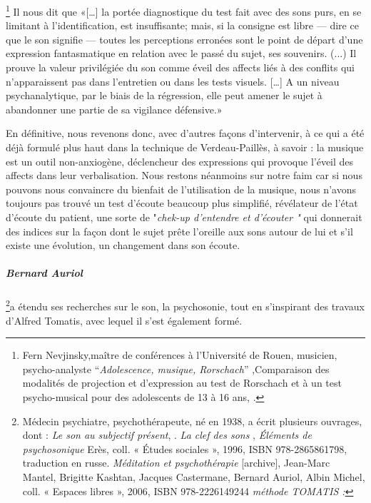 \footnote{Fern Nevjinsky,maître de conférences à l'Université de Rouen, musicien, psycho-analyste ``\emph{Adolescence, musique, Rorschach}'' ,Comparaison des modalités de projection et d'expression au test de Rorschach et à un test psycho-musical pour des adolescents de 13 à 16 ans,
  \cite{Nevjinsky1996}.} Il nous dit  que  «[\ldots] la
portée diagnostique du test fait avec des sons purs, en se limitant à
l'identification, est insuffisante; mais, si la consigne est libre ---
dire ce que le son signifie --- toutes les perceptions erronées sont
le point de départ d'une expression fantasmatique en relation avec le
passé du sujet, ses souvenirs. (...) Il prouve  la valeur privilégiée du son comme éveil
des affects liés à des conflits qui n'apparaissent pas dans
l'entretien ou dans les tests visuels.  [\ldots] A un niveau
psychanalytique, par le biais de la régression, elle peut amener le sujet à abandonner une partie de sa vigilance défensive.»

En définitive, nous revenons donc, avec d'autres façons d'intervenir,
à ce qui a été déjà formulé plus haut dans la technique de Verdeau-Paillès,
à savoir : la musique est un outil non-anxiogène, déclencheur des expressions qui provoque
l'éveil des affects dans  leur verbalisation. Nous restons néanmoins sur notre faim car si nous pouvons nous convaincre du bienfait de l'utilisation de la musique, nous n'avons toujours pas trouvé un test d'écoute beaucoup plus simplifié, révélateur de l'état d'écoute du patient, une sorte de "\textit{chek-up d'entendre et d'écouter "} qui donnerait des indices sur la façon dont le sujet prête l'oreille aux sons autour de lui et s'il existe une évolution, un changement dans son écoute.


\subparagraph{Bernard Auriol}\footnote{Médecin psychiatre, psychothérapeute, né en
  1938, a écrit plusieurs ouvrages, dont : \emph{Le son au subjectif
    présent}, \cite{auriol96sonausubjectifpresent}.
\emph{ La clef des sons} \cite{Auri96:clesons}, \emph{Éléments de
  psychosonique} Erès, coll. « Études sociales », 1996, ISBN
978-2865861798, traduction en russe. \emph{Méditation et
  psychothérapie} {[}archive{]}, Jean-Marc Mantel, Brigitte Kashtan,
Jacques Castermane, Bernard Auriol, Albin Michel, coll. « Espaces
libres », 2006, ISBN 978-2226149244\emph{ méthode TOMATIS :} }a étendu
ses recherches sur le son, la psychosonie, tout en s'inspirant des
travaux d'Alfred Tomatis, avec lequel il s'est également formé.

